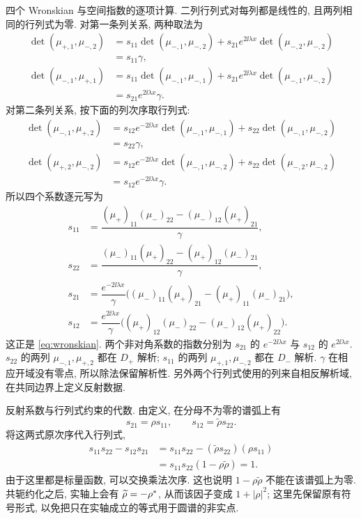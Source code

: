 \par\medskip\noindent 四个 Wronskian 与空间指数的逐项计算.\quad
二列行列式对每列都是线性的, 且两列相同的行列式为零.
对第一条列关系, 两种取法为
\begin{align*}
\det(\mu_{+,1},\mu_{-,2})
&=s_{11}\det(\mu_{-,1},\mu_{-,2})
+s_{21}e^{2\ii\lambda x}\det(\mu_{-,2},\mu_{-,2})\\
&=s_{11}\gamma,\\
\det(\mu_{-,1},\mu_{+,1})
&=s_{11}\det(\mu_{-,1},\mu_{-,1})
+s_{21}e^{2\ii\lambda x}\det(\mu_{-,1},\mu_{-,2})\\
&=s_{21}e^{2\ii\lambda x}\gamma.
\end{align*}
对第二条列关系, 按下面的列次序取行列式:
\begin{align*}
\det(\mu_{-,1},\mu_{+,2})
&=s_{12}e^{-2\ii\lambda x}\det(\mu_{-,1},\mu_{-,1})
+s_{22}\det(\mu_{-,1},\mu_{-,2})\\
&=s_{22}\gamma,\\
\det(\mu_{+,2},\mu_{-,2})
&=s_{12}e^{-2\ii\lambda x}\det(\mu_{-,1},\mu_{-,2})
+s_{22}\det(\mu_{-,2},\mu_{-,2})\\
&=s_{12}e^{-2\ii\lambda x}\gamma.
\end{align*}
所以四个系数逐元写为
\begin{align*}
s_{11}&=\dfrac{(\mu_+)_{11}(\mu_-)_{22}
-(\mu_-)_{12}(\mu_+)_{21}}{\gamma},\\
s_{22}&=\dfrac{(\mu_-)_{11}(\mu_+)_{22}
-(\mu_+)_{12}(\mu_-)_{21}}{\gamma},\\
s_{21}&=\dfrac{e^{-2\ii\lambda x}}{\gamma}
\bigl((\mu_-)_{11}(\mu_+)_{21}
-(\mu_+)_{11}(\mu_-)_{21}\bigr),\\
s_{12}&=\dfrac{e^{2\ii\lambda x}}{\gamma}
\bigl((\mu_+)_{12}(\mu_-)_{22}
-(\mu_-)_{12}(\mu_+)_{22}\bigr).
\end{align*}
这正是 \eqref{eq:wronskian}. 两个非对角系数的指数分别为
$s_{21}$ 的 $e^{-2\ii\lambda x}$ 与 $s_{12}$ 的 $e^{2\ii\lambda x}$.
$s_{22}$ 的两列 $\mu_{-,1},\mu_{+,2}$ 都在 $D_+$ 解析;
$s_{11}$ 的两列 $\mu_{+,1},\mu_{-,2}$ 都在 $D_-$ 解析.
$\gamma$ 在相应开域没有零点, 所以除法保留解析性.
另外两个行列式使用的列来自相反解析域, 在共同边界上定义反射数据.

\par\smallskip\noindent 反射系数与行列式约束的代数.\quad
由定义, 在分母不为零的谱弧上有
\begin{equation*}
s_{21}=\rho s_{11},\qquad s_{12}=\widetilde\rho s_{22}.
\end{equation*}
将这两式原次序代入行列式,
\begin{align*}
s_{11}s_{22}-s_{12}s_{21}
&=s_{11}s_{22}-(\widetilde\rho s_{22})(\rho s_{11})\\
&=s_{11}s_{22}(1-\rho\widetilde\rho)=1.
\end{align*}
由于这里都是标量函数, 可以交换乘法次序.
这也说明 $1-\rho\widetilde\rho$ 不能在该谱弧上为零.
共轭约化之后, 实轴上会有
$\widetilde\rho=-{\rho}^{*}$, 从而该因子变成
$1+|\rho|^2$; 这里先保留原有符号形式,
以免把只在实轴成立的等式用于圆谱的非实点.



